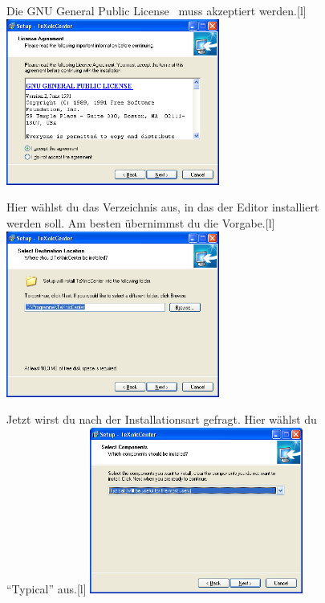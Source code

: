 \begin{figure}[hb]
	\begin{captionbeside}{Die GNU General Public License~\cite{GPL} muss akzeptiert werden.}[l]
		\includegraphics[width=7cm]{images/TeXnicCenter-install-02.png}
	\end{captionbeside}
	\label{fig:install21}
\end{figure}

\begin{figure}[hb]
	\begin{captionbeside}{Hier wählst du das Verzeichnis aus, in das der Editor installiert werden soll. Am besten übernimmst du die Vorgabe.}[l]
		\includegraphics[width=7cm]{images/TeXnicCenter-install-03.png}
	\end{captionbeside}
	\label{fig:install22}
\end{figure}

\begin{figure}[hb]
	\begin{captionbeside}{Jetzt wirst du nach der Installationsart gefragt. Hier wählst du \enquote{Typical} aus.}[l]
		\includegraphics[width=7cm]{images/TeXnicCenter-install-04.png}
	\end{captionbeside}
	\label{fig:install23}
\end{figure}

